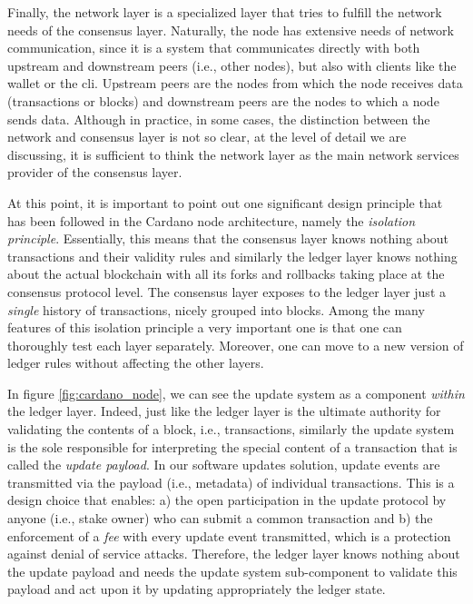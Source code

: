 Finally, the network layer is a specialized layer that tries to fulfill the 
network needs of the consensus layer. Naturally, the node has extensive needs 
of network communication, since it is a system that communicates directly with 
both upstream and downstream peers (i.e., other nodes), but also with clients 
like the wallet or the cli. Upstream peers are the nodes from which the 
node receives data (transactions or blocks) and downstream peers are the nodes 
to which a node sends data. Although in practice, in some cases, the 
distinction between the network and consensus layer is not so clear, at the 
level of detail we are discussing, it is sufficient to think the network layer 
as the main network services provider of the consensus layer.

At this point, it is important to point out one significant design principle 
that has been followed in the Cardano node architecture, namely the
\emph{isolation principle}. Essentially, this means that the consensus layer 
knows nothing about transactions and their validity rules and similarly the 
ledger layer knows nothing about the actual blockchain with all its
forks and rollbacks taking place at the consensus protocol level. The consensus 
layer exposes to the ledger layer just a \emph{single} history of transactions, 
nicely grouped into blocks. Among the many features of this isolation principle 
a very important one is that one can thoroughly test each layer separately. 
Moreover, one can move to a new version of ledger rules without affecting the 
other layers.  

In figure \ref{fig:cardano_node}, we can see the update system as a component 
\emph{within} the ledger layer. Indeed, just like the ledger layer is the 
ultimate authority for validating the contents of a block, i.e., transactions, 
similarly the update system is the sole responsible for interpreting the 
special content of a transaction that is called the \emph{update payload}. In 
our software updates solution, update events are transmitted via the payload 
(i.e., metadata) of individual transactions. This is a design choice that 
enables: a) the open participation in the update protocol by anyone (i.e., 
stake owner) who can submit a common transaction and b) the enforcement of a 
\emph{fee} with every update event transmitted, which is a protection against 
denial of service attacks. Therefore, the ledger layer knows nothing about the 
update payload and needs the update system sub-component to validate this 
payload and act upon it by updating appropriately the ledger state.

